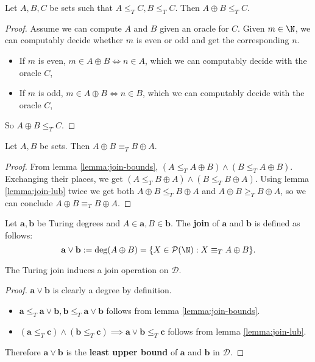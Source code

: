 \documentclass[../main.tex]{memoir}
\begin{document}
\begin{lemma}
  \label{lemma:join-lub}
  Let $A, B, C$ be sets such that $A \le_T C, B \le_T C$. Then $A \oplus B \le_T C$.
\end{lemma}
\begin{proof}
  Assume we can compute $A$ and $B$ given an oracle for $C$. Given $m \in \N$, we can computably decide whether $m$ is even or odd and get the corresponding $n$.
  \begin{itemize}
  \item If $m$ is even, $m \in A \oplus B \iff n \in A$, which we can computably decide with the oracle $C$,
  \item If $m$ is odd, $m \in A \oplus B \iff n \in B$, which we can computably decide with the oracle $C$,
  \end{itemize}
  So $A \oplus B \le_T C$.
\end{proof}

\begin{lemma}
  Let $A, B$ be sets. Then $A \oplus B \equiv_T B \oplus A$.
\end{lemma}
\begin{proof}
  From lemma \ref{lemma:join-bounds}, $(A \le_T A \oplus B) \land (B \le_T A \oplus B)$. Exchanging their places, we get $(A \le_T B \oplus A) \land (B \le_T B \oplus A)$.
  Using lemma \ref{lemma:join-lub} twice we get both $A \oplus B \le_T B \oplus A$ and $A \oplus B \ge_T B \oplus A$, so we can conclude $A \oplus B \equiv_T B \oplus A$.
\end{proof}

\begin{definition}
  Let $\mathbf{a}, \mathbf{b}$ be Turing degrees and $A \in \mathbf{a}, B \in \mathbf{b}$. The \textbf{join} of $\mathbf{a}$ and $\mathbf{b}$ is defined as follows:
  \[ \mathbf{a} \lor \mathbf{b} := \text{deg}(A \oplus B) = \{X \in \mathcal{P}(\N): X \equiv_T A \oplus B\}. \]
\end{definition}

\begin{theorem}
  The Turing join induces a join operation on $\mathbf{\mathcal{D}}$.
\end{theorem}
\begin{proof}
  $\mathbf{a} \lor \mathbf{b}$ is clearly a degree by definition.
  \begin{itemize}
  \item $\mathbf{a} \le_T \mathbf{a} \lor \mathbf{b}, \mathbf{b} \le_T \mathbf{a} \lor \mathbf{b}$ follows from lemma \ref{lemma:join-bounds}.
  \item $(\mathbf{a} \le_T \mathbf{c}) \land (\mathbf{b} \le_T \mathbf{c}) \implies \mathbf{a} \lor \mathbf{b} \le_T \mathbf{c}$ follows from lemma \ref{lemma:join-lub}.
  \end{itemize}
  Therefore $\mathbf{a} \lor \mathbf{b}$ is the \textbf{least upper bound} of $\mathbf{a}$ and $\mathbf{b}$ in $\mathbf{\mathcal{D}}$.
\end{proof}
\end{document}

